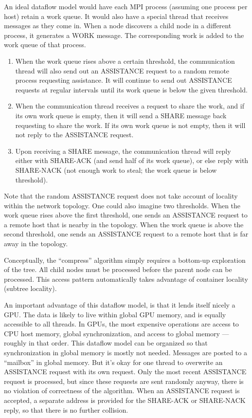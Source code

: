 \documentclass{article}
\begin{document}

An ideal dataflow model would have each MPI process (assuming one process
per host) retain a work queue.  It would also have a special thread that
receives messages as they come in.  When a node discovers a child node in a
different process, it generates a WORK message.  The corresponding work is
added to the work queue of that process.
\begin{enumerate}
\item When the work queue rises above a certain threshold, the communication
thread will also send out an ASSISTANCE request to a random remote process
requesting assistance.  It will continue to send out ASSISTANCE requests
at regular intervals until its work queue is below the given threshold.
\item When the communication thread receives a request to share the
work, and if its own work queue is empty, then it will send a SHARE message
back requesting to share the work.  If its own work queue is not empty,
then it will not reply to the ASSISTANCE request.
\item  Upon receiving a SHARE message, the communication thread will
reply either with SHARE-ACK (and send half of its work queue),
or else reply with SHARE-NACK (not enough work to steal; the work queue
is below threshold).
\end{enumerate}
Note that the random ASSISTANCE request does not take account of
locality within the network topology.  One could also imagine two
thresholds.  When the work queue rises above the first threshold,
one sends an ASSISTANCE request to a remote host that is nearby in the
topology.  When the work queue is above the second threshold, one sends
an ASSISTANCE request to a remote host that is far away in the topology.

Conceptually, the ``compress'' algorithm simply requires a bottom-up
exploration of the tree.  All child nodes must be processed before the
parent node can be processed.  This access pattern automatically takes
advantage of container locality (subtree locality).

An important advantage of this dataflow model, is that it lends itself
nicely a GPU.  The data is likely to live within global GPU memory,
and is equally accessible to all threads.  In GPUs, the most expensive
operations are access to CPU host memory, global synchronization,
and access to global memory --- roughly in that order.
This dataflow model can be organized so that synchronization in global
memory is mostly not needed.  Messages are posted to a ``mailbox''
in global memory.  But it's okay for one thread to overwrite
an ASSISTANCE request with its own request.  Only the most recent
ASSISTANCE request is processed, but since these requests are sent
randomly anyway, there is no violation of correctness of the algorithm.
When an ASSISTANCE request is accepted, a separate address is
provided for the SHARE-ACK or SHARE-NACK reply, so that there is no
further collision.
\end{document}
